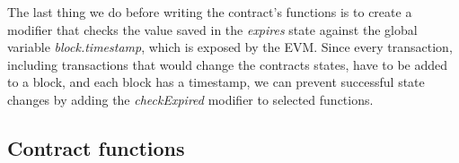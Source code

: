 The last thing we do before writing the contract's functions is to create a modifier that checks the value saved in the \emph{expires} state against the global variable \emph{block.timestamp}, which is exposed by the \gls{EVM}.
Since every transaction, including transactions that would change the contracts states, have to be added to a block, and each block has a timestamp, we can prevent successful state changes by adding the \emph{checkExpired} modifier to selected functions.

\subsection{Contract functions}\label{subsec:contract-functions}





